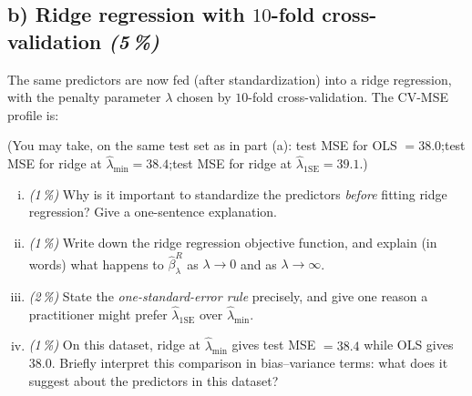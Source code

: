 \documentclass[11pt,a4paper]{article}
\newcommand{\subpoints}[1]{\textit{(#1\,\%)}}
\begin{document}
\subsection*{b) Ridge regression with $10$-fold cross-validation \subpoints{5}}

The same predictors are now fed (after standardization) into a ridge regression, with the penalty parameter $\lambda$ chosen by $10$-fold cross-validation. The CV-MSE profile is:

\begin{center}
\end{center}

\noindent (You may take, on the same test set as in part (a):
test MSE for OLS $= 38.0$;\quad test MSE for ridge at $\hat\lambda_{\min} = 38.4$;\quad test MSE for ridge at $\hat\lambda_{1\mathrm{SE}} = 39.1$.)

\begin{enumerate}[(i)]
  \item \subpoints{1} Why is it important to standardize the predictors \emph{before} fitting ridge regression? Give a one-sentence explanation.
  \item \subpoints{1} Write down the ridge regression objective function, and explain (in words) what happens to $\hat\beta^R_\lambda$ as $\lambda \to 0$ and as $\lambda \to \infty$.
  \item \subpoints{2} State the \emph{one-standard-error rule} precisely, and give one reason a practitioner might prefer $\hat\lambda_{1\mathrm{SE}}$ over $\hat\lambda_{\min}$.
  \item \subpoints{1} On this dataset, ridge at $\hat\lambda_{\min}$ gives test MSE $=38.4$ while OLS gives $38.0$. Briefly interpret this comparison in bias--variance terms: what does it suggest about the predictors in this dataset?
\end{enumerate}
\end{document}
